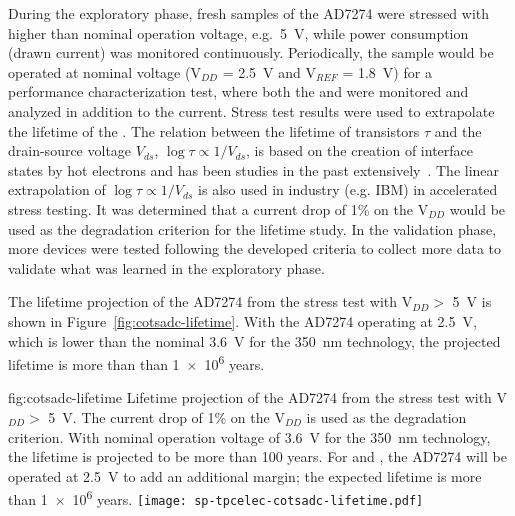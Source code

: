 During the exploratory phase, fresh samples of the   
AD7274 were stressed with higher than nominal operation voltage, e.g.~\SI{5}{V},
while power consumption (drawn current) was monitored continuously. 
Periodically, the sample would be operated at nominal voltage (V$_{DD}$ = \SI{2.5}{V} 
and V$_{REF}$ = \SI{1.8}{V}) for a performance characterization test, where 
both the  and  were monitored and analyzed in addition 
to the current. Stress test results were used to extrapolate the 
lifetime of the  . The relation between the lifetime 
of  transistors $\tau$ and the drain-source voltage $V_{ds}$, 
$\log\tau\propto1/V_{ds}$, is based on the creation of interface states by hot 
electrons and has been studies in the past extensively~\cite{Li:CELAr}.
The linear extrapolation of $\log\tau\propto1/V_{ds}$ is also used in industry (e.g. IBM) 
in accelerated stress testing. It was determined that a current drop 
of \num{1}\% on the V$_{DD}$ would be used as the degradation criterion for the lifetime 
study. In the validation phase, more devices were tested following the developed 
criteria to collect more data to validate what was learned in the exploratory phase.

The lifetime projection of the AD7274  from the stress 
test with V$_{DD} >$ \SI{5}{V} is shown in Figure~\ref{fig:cotsadc-lifetime}. 
With the AD7274 operating at \SI{2.5}{V}, which is lower than the nominal 
\SI{3.6}{V} for the \SI{350}{nm}  technology, the projected lifetime 
is more than than \num{1e6} years.

\begin{dunefigure}
{fig:cotsadc-lifetime}
{Lifetime projection of the   AD7274 from the stress test 
with V$_{DD} >$ \SI{5}{V}. The current drop of 1\% on the V$_{DD}$ is used as 
the degradation criterion. With nominal operation voltage of \SI{3.6}{V} for the 
\SI{350}{nm}  technology, the lifetime is projected to be more 
than 100 years. For  and  , the AD7274 will be
operated at \SI{2.5}{V} to add an additional margin; the expected lifetime is more 
than \num{1e6} years.}
\texttt{[image: sp-tpcelec-cotsadc-lifetime.pdf]}
\end{dunefigure}

